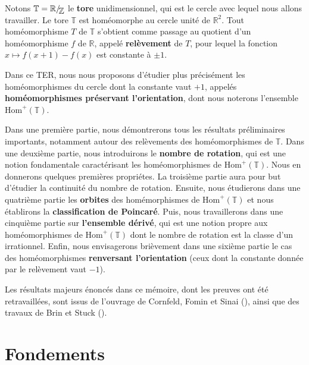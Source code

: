 \documentclass[11pt,a4 paper]{article}
\newcommand{\Tbb}{\mathbb{T}}
\newcommand{\Rbb}{\mathbb{R}}
\newcommand{\Zbb}{\mathbb{Z}}
\newcommand{\HomT}{\mathrm{Hom}^+(\Tbb)}
\newcommand*{\EnsembleQuotient}[2]%
{\ensuremath{%
		#1/\!\raisebox{-.65ex}{\ensuremath{\mathcal{#2}}}}}
\begin{document}
	\begin{large}
		\par Notons $\Tbb =\EnsembleQuotient{\Rbb}{\Zbb}$ le \textbf{tore} unidimensionnel, qui est le cercle avec lequel nous allons travailler. Le tore $\Tbb$ est homéomorphe au cercle unité de $\Rbb^2$. Tout homéomorphisme $T$ de $\Tbb$ s'obtient comme passage au quotient d'un homéomorphisme $f$ de $\Rbb$, appelé \textbf{relèvement} de $T$, pour lequel la fonction $x\mapsto f(x+1)-f(x)$ est constante à $\pm1$.\\
		
		\par Dans ce TER, nous nous proposons d'étudier plus précisément les homéomorphismes du cercle dont la constante vaut $+1$, appelés \textbf{homéomorphismes préservant l'orientation}, dont nous noterons l'ensemble $\HomT$.\\
		
		\par Dans une première partie, nous démontrerons tous les résultats préliminaires importants, notamment autour des relèvements des homéomorphismes de $\Tbb$. Dans une deuxième partie, nous introduirons le \textbf{nombre de rotation}, qui est une notion fondamentale caractérisant les homéomorphismes de $\HomT$. Nous en donnerons quelques premières propriétes. La troisième partie aura pour but d'étudier la continuité du nombre de rotation. Ensuite, nous étudierons dans une quatrième partie les \textbf{orbites} des homémorphismes de $\HomT$ et nous établirons la \textbf{classification de Poincaré}. Puis, nous travaillerons dans une cinquième partie sur \textbf{l'ensemble dérivé}, qui est une notion propre aux homéomorphismes de $\HomT$ dont le nombre de rotation est la classe d'un irrationnel. Enfin, nous envisagerons brièvement dans une sixième partie le cas des homéomorphismes \textbf{renversant l'orientation} (ceux dont la constante donnée par le relèvement vaut $-1$).\\
		
		\par Les résultats majeurs énoncés dans ce mémoire, dont les preuves ont été retravaillées, sont issus de l'ouvrage de Cornfeld, Fomin et Sinai (\cite{1}), ainsi que des travaux de Brin et Stuck (\cite{2}).
	\end{large}




	
\newpage
\section{Fondements}
\end{document}
